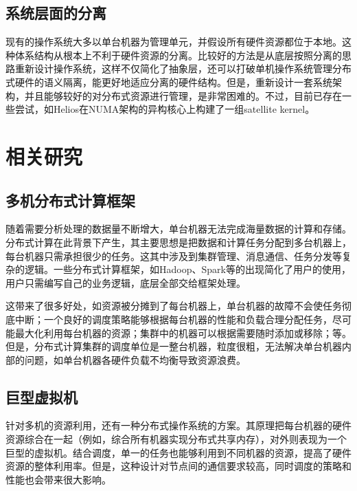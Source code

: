 \subsection{系统层面的分离}

现有的操作系统大多以单台机器为管理单元，并假设所有硬件资源都位于本地。这种体系结构从根本上不利于硬件资源的分离。比较好的方法是从底层按照分离的思路重新设计操作系统，这样不仅简化了抽象层，还可以打破单机操作系统管理分布式硬件的语义隔离，能更好地适应分离的硬件结构。但是，重新设计一套系统架构，并且能够较好的对分布式资源进行管理，是非常困难的。不过，目前已存在一些尝试，如Helios\parencite{nightingale2009helios}在NUMA架构的异构核心上构建了一组satellite kernel。


\section{相关研究}

\subsection{多机分布式计算框架}

随着需要分析处理的数据量不断增大，单台机器无法完成海量数据的计算和存储。分布式计算在此背景下产生，其主要思想是把数据和计算任务分配到多台机器上，每台机器只需承担很少的任务。这其中涉及到集群管理、消息通信、任务分发等复杂的逻辑。一些分布式计算框架，如Hadoop、Spark等的出现简化了用户的使用，用户只需编写自己的业务逻辑，底层全部交给框架处理。

这带来了很多好处，如资源被分摊到了每台机器上，单台机器的故障不会使任务彻底中断；一个良好的调度策略能够根据每台机器的性能和负载合理分配任务，尽可能最大化利用每台机器的资源；集群中的机器可以根据需要随时添加或移除；等。但是，分布式计算集群的调度单位是一整台机器，粒度很粗，无法解决单台机器内部的问题，如单台机器各硬件负载不均衡导致资源浪费。

\subsection{巨型虚拟机}

针对多机的资源利用，还有一种分布式操作系统的方案。其原理把每台机器的硬件资源综合在一起（例如，综合所有机器实现分布式共享内存），对外则表现为一个巨型的虚拟机。结合调度，单一的任务也能够利用到不同机器的资源，提高了硬件资源的整体利用率。但是，这种设计对节点间的通信要求较高，同时调度的策略和性能也会带来很大影响。

